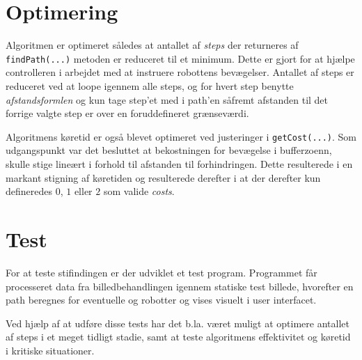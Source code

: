 \section{Optimering}
Algoritmen er optimeret således at antallet af \textit{steps} der returneres af \texttt{findPath(...)} metoden er reduceret til et minimum. Dette er gjort for at hjælpe controlleren i arbejdet med at instruere robottens bevægelser. Antallet af steps er reduceret ved at loope igennem alle steps, og for hvert step benytte \textit{afstandsformlen} og kun tage step'et med i path'en såfremt afstanden til det forrige valgte step er over en foruddefineret grænseværdi.

Algoritmens køretid er også blevet optimeret ved justeringer i \texttt{getCost(...)}. Som udgangspunkt var det besluttet at bekostningen for bevægelse i bufferzoenn, skulle stige lineært i forhold til afstanden til forhindringen. Dette resulterede i en markant stigning af køretiden og resulterede derefter i at der derefter kun defineredes $0$, $1$ eller $2$ som valide \textit{costs}.

\section{Test}
For at teste stifindingen er der udviklet et test program. Programmet får processeret data fra billedbehandlingen igennem statiske test billede, hvorefter en path beregnes for eventuelle og robotter og vises visuelt i user interfacet.

Ved hjælp af at udføre disse tests har det b.la. været muligt at optimere antallet af steps i et meget tidligt stadie, samt at teste algoritmens effektivitet og køretid i kritiske situationer.